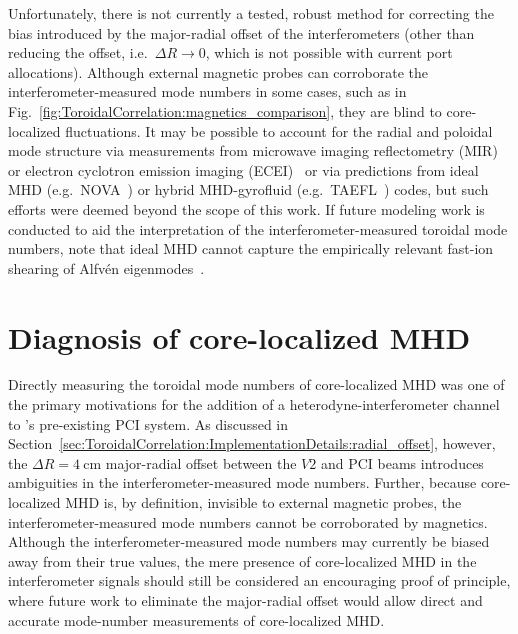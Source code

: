 Unfortunately, there is not currently a tested, robust method
for correcting the bias introduced by
the major-radial offset of the interferometers
(other than reducing the offset, i.e.\ $\Delta R \rightarrow 0$,
which is not possible with current port allocations).
Although external magnetic probes can corroborate
the interferometer-measured mode numbers in some cases,
such as in Fig.~\ref{fig:ToroidalCorrelation:magnetics_comparison},
they are blind to core-localized fluctuations.
It may be possible to account for the radial and poloidal mode structure
via measurements from
microwave imaging reflectometry (MIR)~\cite{muscatello_rsi14} or
electron cyclotron emission imaging (ECEI)~\cite{tobias_rsi10}
or via predictions from
ideal MHD (e.g.\ NOVA~\cite{cheng_jcp87, cheng_pr92})
or hybrid MHD-gyrofluid (e.g.\ TAEFL~\cite{spong_pfb92, spong_ps92}) codes,
but such efforts were deemed beyond the scope of this work.
If future modeling work is conducted to aid the interpretation
of the interferometer-measured toroidal mode numbers,
note that ideal MHD cannot capture the empirically relevant
fast-ion shearing of Alfv\'{e}n eigenmodes~\cite{tobias_prl11}.


\section{Diagnosis of core-localized MHD}
\label{sec:ToroidalCorrelation:CoreLocalized}
Directly measuring the toroidal mode numbers of core-localized MHD
was one of the primary motivations for the addition
of a heterodyne-interferometer channel to \diiid's pre-existing PCI system.
As discussed in
Section~\ref{sec:ToroidalCorrelation:ImplementationDetails:radial_offset},
however, the $\Delta R = \SI{4}{\centi\meter}$ major-radial offset
between the $V2$ and PCI beams
introduces ambiguities in the interferometer-measured mode numbers.
Further, because core-localized MHD is, by definition,
invisible to external magnetic probes,
the interferometer-measured mode numbers
cannot be corroborated by magnetics.
Although the interferometer-measured mode numbers
may currently be biased away from their true values,
the mere presence of core-localized MHD in the interferometer signals
should still be considered an encouraging proof of principle,
where future work to eliminate the major-radial offset
would allow direct and accurate
mode-number measurements of core-localized MHD.

